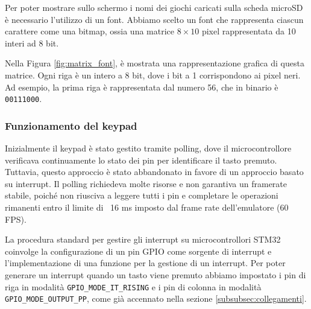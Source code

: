 \documentclass[a4paper]{article}
\begin{document}
Per poter mostrare  sullo schermo  i nomi dei giochi caricati sulla scheda microSD è
necessario l'utilizzo di un font. Abbiamo scelto un font che rappresenta ciascun carattere
come una bitmap, ossia una matrice $8 \times 10$ pixel rappresentata da 10 interi ad 8 bit.

Nella Figura \ref{fig:matrix_font}, è mostrata una rappresentazione grafica di questa matrice.
Ogni riga è un intero a 8 bit, dove i bit a 1 corrispondono ai pixel neri. Ad esempio,
la prima riga è rappresentata dal numero 56, che in binario è \texttt{00111000}.

\clearpage

\subsubsection{Funzionamento del keypad}\label{subsubsec:keypad}

Inizialmente il keypad è stato gestito tramite polling, dove il microcontrollore verificava
continuamente lo stato dei pin per identificare il tasto premuto. Tuttavia, questo approccio
è stato abbandonato in favore di un approccio basato su interrupt. Il polling richiedeva
molte risorse e non garantiva un framerate stabile, poiché non riusciva a leggere tutti
i pin e completare le operazioni rimanenti entro il limite di ~16 ms imposto dal frame rate
dell'emulatore (60 FPS).

La procedura standard per gestire gli interrupt su microcontrollori STM32 coinvolge
la configurazione di un pin GPIO come sorgente di interrupt e l'implementazione di
una funzione per la gestione di un interrupt. Per poter generare un interrupt quando
un tasto viene premuto abbiamo impostato i pin di riga in modalità \texttt{GPIO\_MODE\_IT\_RISING}
e i pin di colonna in modalità \texttt{GPIO\_MODE\_OUTPUT\_PP}, come già accennato nella
sezione \ref{subsubsec:collegamenti}.

%
%
\end{document}
